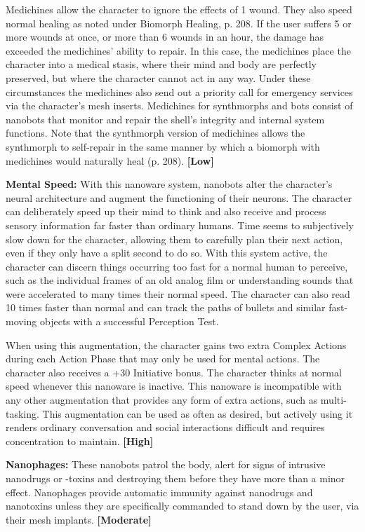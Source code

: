 Medichines allow the character to ignore the effects of 1 wound. They also speed normal healing as noted under Biomorph Healing, p. 208. If the user suffers 5 or more wounds at once, or more than 6 wounds in an hour, the damage has exceeded the medichines’ ability to repair. In this case, the medichines place the character into a medical stasis, where their mind and body are perfectly preserved, but where the character cannot act in any way. Under these circumstances the medichines also send out a priority call for emergency services via the character’s mesh inserts. Medichines for synthmorphs and bots consist of nanobots that monitor and repair the shell’s integrity and internal system functions. Note that the synthmorph version of medichines allows the synthmorph to self-repair in the same manner by which a biomorph with medichines would naturally heal (p. 208). \textbf{[Low]}

\textbf{Mental Speed:} With this nanoware system, nanobots alter the character’s neural architecture and augment the functioning of their neurons. The character can deliberately speed up their mind to think and also receive and process sensory information far faster than ordinary humans. Time seems to subjectively slow down for the character, allowing them to carefully plan their next action, even if they only have a split second to do so. With this system active, the character can discern things occurring too fast for a normal human to perceive, such as the individual frames of an old analog film or understanding sounds that were accelerated to many times their normal speed. The character can also read 10 times faster than normal and can track the paths of bullets and similar fast-moving objects with a successful Perception Test.

When using this augmentation, the character gains two extra Complex Actions during each Action Phase that may only be used for mental actions. The character also receives a +30 Initiative bonus. The character thinks at normal speed whenever this nanoware is inactive. This nanoware is incompatible with any other augmentation that provides any form of extra actions, such as multi-tasking. This augmentation can be used as often as desired, but actively using it renders ordinary conversation and social interactions difficult and requires concentration to maintain. \textbf{[High]}

\textbf{Nanophages:} These nanobots patrol the body, alert for signs of intrusive nanodrugs or -toxins and destroying them before they have more than a minor effect. Nanophages provide automatic immunity against nanodrugs and nanotoxins unless they are specifically commanded to stand down by the user, via their mesh implants. \textbf{[Moderate]}

